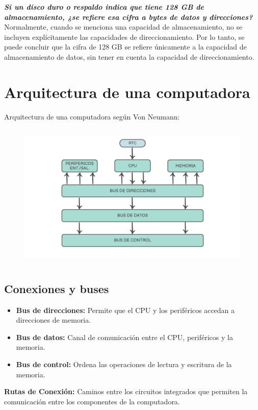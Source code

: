 \documentclass{templateNote}
\begin{document}
\noindent \textbf{\textit{Si un disco duro o respaldo indica que tiene 128 GB de almacenamiento, ¿se refiere esa cifra a bytes de datos y direcciones?}} \\
Normalmente, cuando se menciona una capacidad de almacenamiento, no se incluyen explícitamente las capacidades de direccionamiento. Por lo tanto, se puede concluir 
que la cifra de 128 GB se refiere únicamente a la capacidad de almacenamiento de datos, sin tener en cuenta la capacidad de direccionamiento.


\newpage

\section{Arquitectura de una computadora} 
\noindent Arquitectura de una computadora según Von Neumann:
\begin{figure}[H]
    \centering
    \includegraphics[height=7cm]{img/compubasica.png}
\end{figure}

\subsection{Conexiones y buses}
\begin{itemize}
    \item \textbf{Bus de direcciones:} Permite que el CPU y los periféricos accedan a direcciones de memoria.
    \item \textbf{Bus de datos:} Canal de comunicación entre el CPU, periféricos y la memoria.
    \item \textbf{Bus de control:} Ordena las operaciones de lectura y escritura de la memoria.
\end{itemize}
\textbf{Rutas de Conexión:} Caminos entre los circuitos integrados que permiten la comunicación entre los componentes de la computadora.
\end{document}
